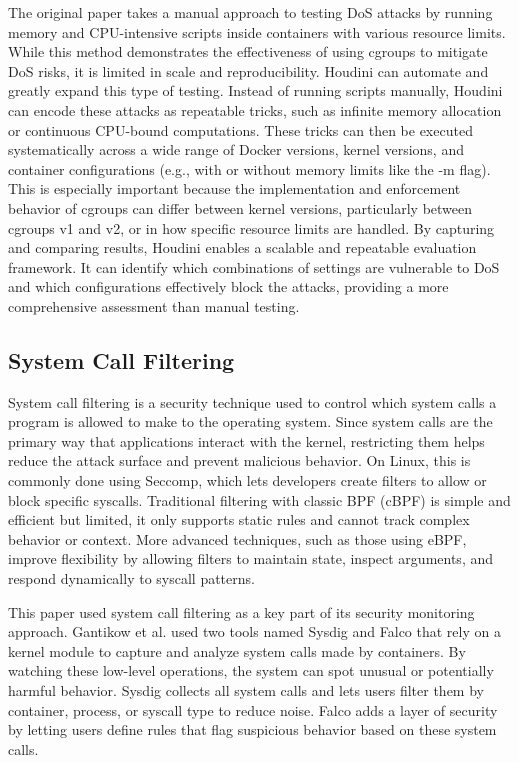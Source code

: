 \documentclass[12pt]{report}
\begin{document}
\begin{doublespace}
The original paper takes a manual approach to testing DoS attacks by running memory and CPU-intensive scripts inside containers with various resource limits. While this method demonstrates the effectiveness of using cgroups to mitigate DoS risks, it is limited in scale and reproducibility. Houdini can automate and greatly expand this type of testing. Instead of running scripts manually, Houdini can encode these attacks as repeatable tricks, such as infinite memory allocation or continuous CPU-bound computations. These tricks can then be executed systematically across a wide range of Docker versions, kernel versions, and container configurations (e.g., with or without memory limits like the -m flag). This is especially important because the implementation and enforcement behavior of cgroups can differ between kernel versions, particularly between cgroups v1 and v2, or in how specific resource limits are handled. By capturing and comparing results, Houdini enables a scalable and repeatable evaluation framework. It can identify which combinations of settings are vulnerable to DoS and which configurations effectively block the attacks, providing a more comprehensive assessment than manual testing.


\subsection{System Call Filtering}

System call filtering is a security technique used to control which system calls a program is allowed to make to the operating system. Since system calls are the primary way that applications interact with the kernel, restricting them helps reduce the attack surface and prevent malicious behavior. On Linux, this is commonly done using Seccomp, which lets developers create filters to allow or block specific syscalls. Traditional filtering with classic BPF (cBPF) is simple and efficient but limited, it only supports static rules and cannot track complex behavior or context. More advanced techniques, such as those using eBPF, improve flexibility by allowing filters to maintain state, inspect arguments, and respond dynamically to syscall patterns. 

This paper used system call filtering as a key part of its security monitoring approach. Gantikow et al. \cite{gantikow2019rule} used two tools named Sysdig and Falco that rely on a kernel module to capture and analyze system calls made by containers. By watching these low-level operations, the system can spot unusual or potentially harmful behavior. Sysdig collects all system calls and lets users filter them by container, process, or syscall type to reduce noise. Falco adds a layer of security by letting users define rules that flag suspicious behavior based on these system calls.


\end{doublespace}
\end{document}
